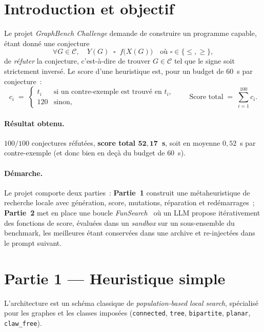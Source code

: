 \documentclass[11pt,a4paper]{article}
\begin{document}
\section{Introduction et objectif}

Le projet \emph{GraphBench Challenge} demande de construire un programme
capable, étant donné une conjecture
\[
  \forall G \in \mathcal{C},\quad Y(G) \;\mathrel{\square}\; f\bigl(X(G)\bigr)
  \quad\text{où } \square \in \{\le, \ge\},
\]
de \emph{réfuter} la conjecture, c'est-à-dire de trouver
$G \in \mathcal{C}$ tel que le signe soit strictement inversé. Le score d'une
heuristique est, pour un budget de $60$~s par conjecture~:
\[
  c_i \;=\; \begin{cases} t_i & \text{si un contre-exemple est trouvé en } t_i, \\
                          120 & \text{sinon},\end{cases}
  \qquad
  \text{Score total} \;=\; \sum_{i=1}^{100} c_i.
\]

\paragraph{Résultat obtenu.}
$100/100$ conjectures réfutées, \textbf{score total $\mathbf{52{,}17}$~s}, soit
en moyenne $0{,}52$~s par contre-exemple (et donc bien en deçà du budget de
$60$~s).

\paragraph{Démarche.}
Le projet comporte deux parties~: \textbf{Partie~1} construit une
métaheuristique de recherche locale avec génération, score, mutations,
réparation et redémarrages~; \textbf{Partie~2} met en place une boucle
\emph{FunSearch}~\cite{romera2024funsearch} où un LLM propose itérativement
des fonctions de score, évaluées dans un \emph{sandbox} sur un sous-ensemble
du benchmark, les meilleures étant conservées dans une archive et
re-injectées dans le prompt suivant.

\section{Partie 1 — Heuristique simple}

L'architecture est un schéma classique de \emph{population-based local
search}, spécialisé pour les graphes et les classes imposées
(\texttt{connected}, \texttt{tree}, \texttt{bipartite}, \texttt{planar},
\texttt{claw\_free}).
\end{document}
